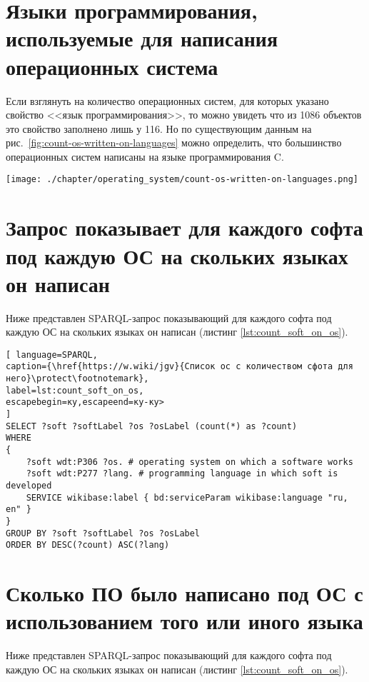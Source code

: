 \section{Языки программирования, используемые для написания операционных система}
Если взглянуть на количество операционных систем, для которых указано свойство <<язык программирования>>, то можно увидеть что из 1086 объектов это свойство заполнено лишь у 116. Но по существующим данным на рис.~\ref{fig:count-os-written-on-languages} можно определить, что большинство операционных систем написаны на языке программирования C. 
\begin{figure*}[h!]
	\texttt{[image: ./chapter/operating\_system/count-os-written-on-languages.png]}
	\caption{Количество операционных систем, написанных на языках программирования (данные на 2020 год.)}
	\label{fig:count-os-written-on-languages}
\end{figure*}


\section{Запрос показывает для каждого софта под каждую ОС на скольких языках он написан}
Ниже представлен SPARQL-запрос показывающий для каждого софта под каждую ОС на скольких языках он написан (листинг \ref{lst:count_soft_on_os}).

\begin{lstlisting}[ language=SPARQL, 
caption={\href{https://w.wiki/jgv}{Список ос с количеством сфота для него}\protect\footnotemark},
label=lst:count_soft_on_os, 
escapebegin=ку,escapeend=ку-ку>
]
SELECT ?soft ?softLabel ?os ?osLabel (count(*) as ?count)
WHERE
{
	?soft wdt:P306 ?os. # operating system on which a software works
	?soft wdt:P277 ?lang. # programming language in which soft is developed
	SERVICE wikibase:label { bd:serviceParam wikibase:language "ru, en" }
}
GROUP BY ?soft ?softLabel ?os ?osLabel
ORDER BY DESC(?count) ASC(?lang)
\end{lstlisting}


\section{Сколько ПО было написано под ОС с использованием того или иного языка}
Ниже представлен SPARQL-запрос показывающий для каждого софта под каждую ОС на скольких языках он написан (листинг \ref{lst:count_soft_on_os}).

